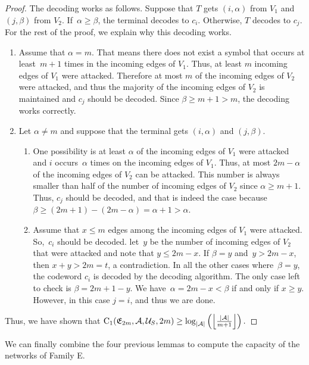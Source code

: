 \documentclass[11pt,a4paper]{article}
\theoremstyle{definition}
\newcommand{\mA}{\mathcal{A}}
\newcommand{\mU}{\mathcal{U}}
\newcommand{\CC}{\textnormal{C}}
\begin{document}
\begin{proof}
The decoding works as follows. Suppose that $T$ gets $(i,\alpha)$ from $V_1$ and $(j,\beta)$ from $V_2$. If~$\alpha \ge \beta$, the terminal decodes to $c_i$. Otherwise, $T$ decodes to $c_j$. For the rest of the proof, we explain why this decoding works.
\begin{enumerate}
    \item Assume that $\alpha=m$. That means there does not exist a symbol that occurs at least~$m+1$ times in the incoming edges of $V_1$. Thus, at least $m$ incoming edges of $V_1$ were attacked. Therefore at most $m$ of the incoming edges of $V_2$ were attacked, and thus the majority of the incoming edges of $V_2$ is maintained and $c_j$ should be decoded. Since $\beta \ge m+1 > m$, the decoding works correctly. 
    \item Let $\alpha \neq m$ and suppose that the terminal gets $(i,\alpha)$ and $(j,\beta)$. \begin{enumerate}
        \item One possibility is at least $\alpha$ of the incoming edges of $V_1$ were attacked and $i$ occurs~$\alpha$ times on the incoming edges of $V_1$. Thus, at most $2m-\alpha$ of the incoming edges of $V_2$ can be attacked. This number is always smaller than half of the number of incoming edges of $V_2$ since $\alpha \ge m+1$. Thus, $c_j$ should be decoded, and that is indeed the case because $\beta \ge (2m+1)-(2m-\alpha)=\alpha+1 > \alpha$.
        \item Assume that $x\le m$ edges among the incoming edges of $V_1$ were attacked. So,~$c_i$ should be decoded.  
        let~$y$ be the number of incoming edges of $V_2$ that were attacked and note that
        $y \le 2m-x$. If $\beta = y$ and~$y > 2m-x$, then $x+y > 2m=t$, a contradiction. In all the other cases where~$\beta =y$, the codeword $c_i$ is decoded by the decoding algorithm. The only case left to check 
        is $\beta = 2m+1-y$. We have~$\alpha = 2m-x < \beta$ if and only if $x \ge y$. However, in this case $j=i$, and thus we are done.
    \end{enumerate}
\end{enumerate}

Thus, we have shown that $\CC_1(\mathfrak{E}_{2m},\mA,\mU_S,2m) \ge \log_{|\mA|}\left(\left\lfloor\tfrac{|\mathcal{A}|}{m+1}\right\rfloor\right).$
\end{proof}


We can finally combine the four previous lemmas to compute the capacity of the networks of Family E.
\end{document}

